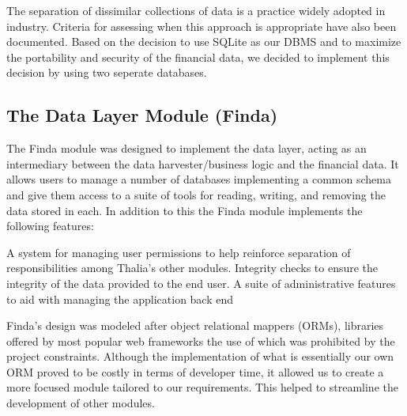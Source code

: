 \documentclass[main.tex]{subfiles}
\begin{document}
The separation of dissimilar collections of data is a practice widely adopted in industry. Criteria for assessing when this approach is appropriate have also been documented. \cite{dataSegImp} Based on the decision to use SQLite as our DBMS and to maximize the portability and security of the financial data, we decided to implement this decision by using two seperate databases.

\subsection{The Data Layer Module (Finda)}

The Finda module was designed to implement the data layer, acting as an intermediary between the data harvester/business logic and the financial data. It allows users to manage a number of databases implementing a common schema and give them access to a suite of tools for reading, writing, and removing the data stored in each. In addition to this the Finda module implements the following features:

A system for managing user permissions to help reinforce separation of responsibilities among Thalia's other modules. 
Integrity checks to ensure the integrity of the data provided to the end user. 
A suite of administrative features to aid with managing the application back end

Finda's design was modeled after object relational mappers (ORMs), libraries offered by most popular web frameworks the use of which was prohibited by the project constraints. Although the implementation of what is essentially our own ORM proved to be costly in terms of developer time, it allowed us to create a more focused module tailored to our requirements. This helped to streamline the development of other modules.
\end{document}
